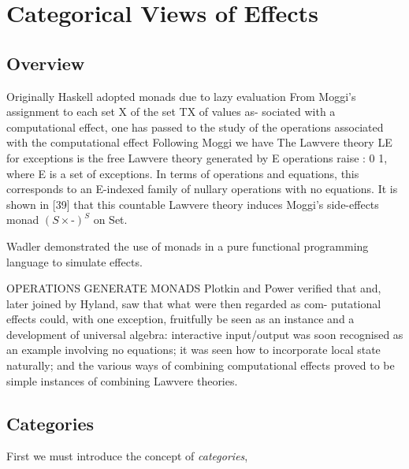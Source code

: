 \documentclass[a4paper,10pt]{article}
\theoremstyle{definition}
\begin{document}
\section{Categorical Views of Effects}
\subsection{Overview}
Originally Haskell \cite{} adopted monads due to lazy evaluation
From Moggi’s assignment to each set X of the set TX of values as- sociated with a computational effect, one has passed to the study of the operations associated with the computational effect
\cite{hyland2007category}
Following Moggi we have \cite{plotkin2001adequacy}
The Lawvere theory LE for exceptions is the free Lawvere theory generated by E operations raise : 0  1,
where E is a set of exceptions.
In terms of operations and equations,
this corresponds to an E-indexed family of nullary operations with no equations.
It is shown in [39]
that this countable Lawvere theory induces Moggi’s side-effects monad $(S \times \textrm{-})^S$ on
Set.
\cite{hyland2007category}

Wadler \cite{wadler1990comprehending} demonstrated the use of monads in a pure
functional programming language to simulate effects.

OPERATIONS GENERATE MONADS \cite{plotkin2001adequacy}
Plotkin and Power verified that and, later joined by Hyland, saw that what were then regarded as com- putational effects could, with one exception, fruitfully be seen as an instance and a development of universal algebra: interactive input/output was soon recognised as an example involving no equations; it was seen how to incorporate local state naturally; and the various ways of combining computational effects proved to be simple instances of combining Lawvere theories.


\subsection{Categories}
First we must introduce the concept of \textit{categories},
\end{document}
